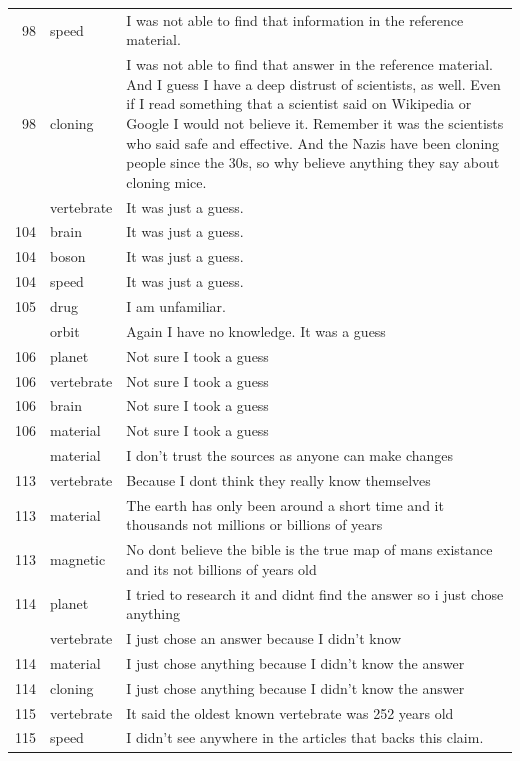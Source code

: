 \documentclass[
  doc,floatsintext]{apa6}
\begin{document}
\begin{longtable}[t]{>{}r>{}l>{\raggedright\arraybackslash}p{30em}}
98 & speed & I was not able to find that information in the reference material.\\
98 & cloning & I was not able to find that answer in the reference material. And I guess I have a deep distrust of scientists, as well. Even if I read something that a scientist said on Wikipedia or Google I would not believe it. Remember it was the scientists who said safe and effective. And the Nazis have been cloning people since the 30s, so why believe anything they say about cloning mice.\\
\addlinespace
104 & vertebrate & It was just a guess.\\
104 & brain & It was just a guess.\\
104 & boson & It was just a guess.\\
104 & speed & It was just a guess.\\
105 & drug & I am unfamiliar.\\
\addlinespace
105 & orbit & Again I have no knowledge. It was a guess\\
106 & planet & Not sure I took a guess\\
106 & vertebrate & Not sure I took a guess\\
106 & brain & Not sure I took a guess\\
106 & material & Not sure I took a guess\\
\addlinespace
108 & material & I don’t trust the sources as anyone can make changes\\
113 & vertebrate & Because I dont think they really know themselves\\
113 & material & The earth has only been around a short time and it thousands not millions or billions of years\\
113 & magnetic & No dont believe the bible is the true map of mans existance and its not billions of years old\\
114 & planet & I tried to research it and didnt find the answer so i just chose anything\\
\addlinespace
114 & vertebrate & I just chose an answer because I didn't know\\
114 & material & I just chose anything because I didn't know the answer\\
114 & cloning & I just chose anything because I didn't know the answer\\
115 & vertebrate & It said the oldest known vertebrate was 252 years old\\
115 & speed & I didn’t see anywhere in the articles that backs this claim.\\

\end{longtable}
\end{document}
